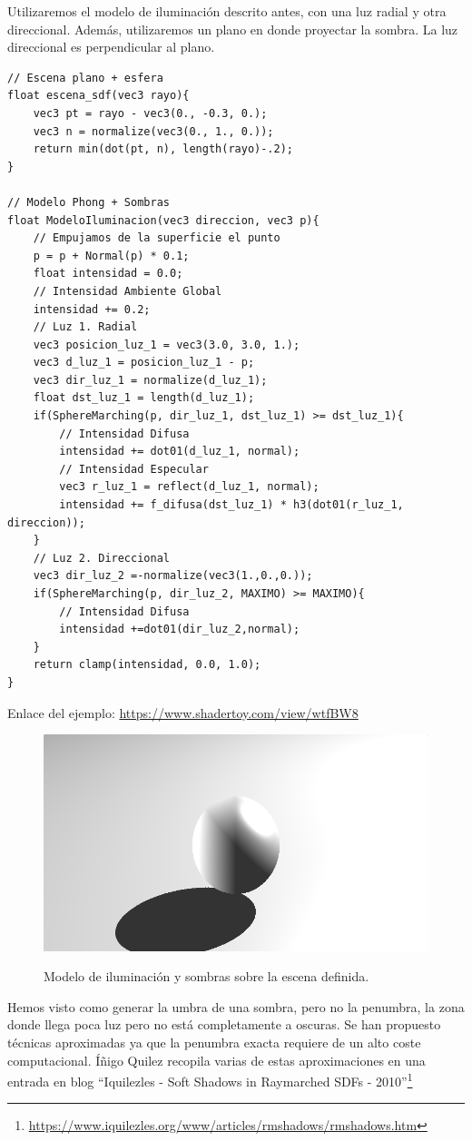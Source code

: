 Utilizaremos el modelo de iluminación descrito antes, con una luz radial y otra direccional. Además, utilizaremos un plano en donde proyectar la sombra. La luz direccional es perpendicular al plano.\\
\begin{lstlisting}
// Escena plano + esfera
float escena_sdf(vec3 rayo){
    vec3 pt = rayo - vec3(0., -0.3, 0.);
    vec3 n = normalize(vec3(0., 1., 0.));
    return min(dot(pt, n), length(rayo)-.2);
}

// Modelo Phong + Sombras
float ModeloIluminacion(vec3 direccion, vec3 p){
    // Empujamos de la superficie el punto 
    p = p + Normal(p) * 0.1;
    float intensidad = 0.0;
    // Intensidad Ambiente Global
    intensidad += 0.2;
    // Luz 1. Radial
    vec3 posicion_luz_1 = vec3(3.0, 3.0, 1.);
    vec3 d_luz_1 = posicion_luz_1 - p;
    vec3 dir_luz_1 = normalize(d_luz_1);
    float dst_luz_1 = length(d_luz_1);
    if(SphereMarching(p, dir_luz_1, dst_luz_1) >= dst_luz_1){
        // Intensidad Difusa
        intensidad += dot01(d_luz_1, normal);
        // Intensidad Especular
        vec3 r_luz_1 = reflect(d_luz_1, normal);
        intensidad += f_difusa(dst_luz_1) * h3(dot01(r_luz_1, direccion));
    }
    // Luz 2. Direccional
    vec3 dir_luz_2 =-normalize(vec3(1.,0.,0.));
    if(SphereMarching(p, dir_luz_2, MAXIMO) >= MAXIMO){
        // Intensidad Difusa
        intensidad +=dot01(dir_luz_2,normal);
    }
    return clamp(intensidad, 0.0, 1.0);
}
\end{lstlisting}

Enlace del ejemplo: \url{https://www.shadertoy.com/view/wtfBW8}

\begin{figure}[H]
  \centering
  \captionsetup{justification=centering}%
  \includegraphics[width=1.0\textwidth]{secciones/imagenes/lightmodel/sombra_dura.png}\label{fig:shadow}
  \caption{Modelo de iluminación y sombras sobre la escena definida.}
\end{figure}

Hemos visto como generar la umbra de una sombra, pero no la penumbra, la zona donde llega poca luz pero no está completamente a oscuras. Se han propuesto técnicas aproximadas ya que la penumbra exacta requiere de un alto coste computacional. Íñigo Quilez recopila varias de estas aproximaciones en una entrada en blog
\enquote{Iquilezles - Soft Shadows in Raymarched SDFs - 2010}\footnote{\url{https://www.iquilezles.org/www/articles/rmshadows/rmshadows.htm}}


\newpage
